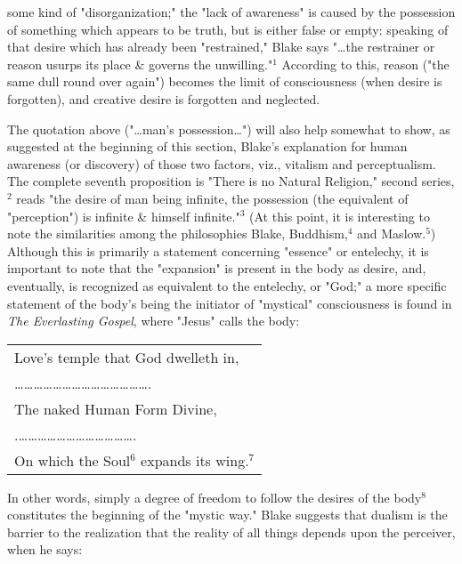 \noindent some kind of "disorganization;" the "lack of awareness" is
caused by the possession of something which appears to be truth, but is either false or empty: speaking of that desire which has already been "restrained," Blake
says "\dots the restrainer or reason usurps its place \& governs the unwilling."$^{1}$ According to this, reason ("the same dull round over again") becomes the limit of consciousness
(when desire is forgotten), and creative desire is forgotten and neglected.\par
\vspace*{0.5\baselineskip}
The quotation above ("\dots man's possession\dots") will also help somewhat to show, as suggested at the beginning of this section, Blake's 
explanation for human awareness (or discovery) of those two factors, viz., vitalism and perceptualism. The complete seventh proposition is "There is no Natural Religion," second
series,$^{2}$ reads "the desire of man being infinite, the possession (the equivalent of "perception") is infinite \& himself infinite."$^{3}$ (At this point, it is interesting to note the similarities among the philosophies
Blake, Buddhism,$^{4}$ and Maslow.$^{5}$) Although this is primarily a statement concerning "essence" or entelechy, it is important to note
that the "expansion" is present in the body as desire, and, eventually, is recognized as equivalent to the entelechy, or "God;" a more specific
statement of the body's being the initiator of "mystical" consciousness is found in \textit{The Everlasting Gospel}, where "Jesus" calls the body:\par
\begin{center}
	\parbox{0.8\textwidth}{
		\centering
		\begin{tabular}{l}
			Love's temple that God dwelleth in,                                     \\
			\dots\dots\dots\dots\dots\dots\dots\dots\dots\dots\dots\dots\dots\dots. \\
			The naked Human Form Divine,                                            \\
			.\dots\dots\dots\dots\dots\dots\dots\dots\dots\dots\dots\dots.          \\
			On which the Soul$^{6}$ expands its wing.$^{7}$
		\end{tabular}
	}%
\end{center}
\hspace*{5mm}In other words, simply a degree of freedom to follow the desires of the body$^{8}$ constitutes the beginning of the "mystic way."
Blake suggests that dualism is the barrier to the realization that the reality of all things depends upon the perceiver, when he says:\par
\vspace*{0.5\baselineskip}

